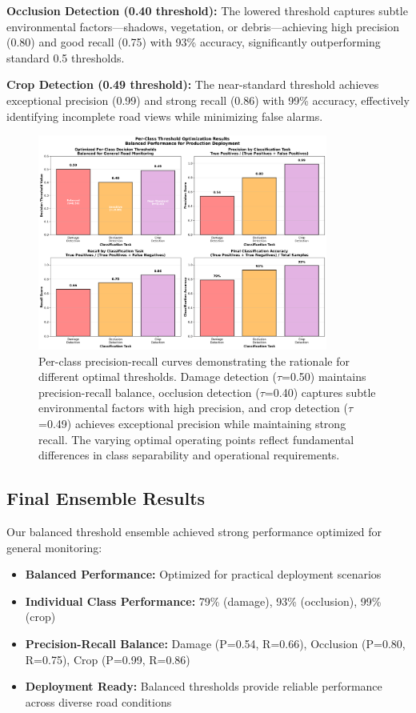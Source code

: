 \documentclass[12pt]{article}
\begin{document}
\textbf{Occlusion Detection (0.40 threshold):} The lowered threshold captures subtle environmental factors—shadows, vegetation, or debris—achieving high precision (0.80) and good recall (0.75) with 93\% accuracy, significantly outperforming standard 0.5 thresholds.

\textbf{Crop Detection (0.49 threshold):} The near-standard threshold achieves exceptional precision (0.99) and strong recall (0.86) with 99\% accuracy, effectively identifying incomplete road views while minimizing false alarms.

\begin{figure}[!htb]
\centering
\includegraphics[width=0.85\textwidth]{images/threshold_optimization_analysis.png}
\caption{Per-class precision-recall curves demonstrating the rationale for different optimal thresholds. Damage detection ($\tau$=0.50) maintains precision-recall balance, occlusion detection ($\tau$=0.40) captures subtle environmental factors with high precision, and crop detection ($\tau$=0.49) achieves exceptional precision while maintaining strong recall. The varying optimal operating points reflect fundamental differences in class separability and operational requirements.}
\end{figure}

\subsection{Final Ensemble Results}

Our balanced threshold ensemble achieved strong performance optimized for general monitoring:

\begin{itemize}[itemsep=1pt,parsep=0pt,topsep=3pt]
\item \textbf{Balanced Performance:} Optimized for practical deployment scenarios
\item \textbf{Individual Class Performance:} 79\% (damage), 93\% (occlusion), 99\% (crop)
\item \textbf{Precision-Recall Balance:} Damage (P=0.54, R=0.66), Occlusion (P=0.80, R=0.75), Crop (P=0.99, R=0.86)
\item \textbf{Deployment Ready:} Balanced thresholds provide reliable performance across diverse road conditions
\end{itemize}
\end{document}
